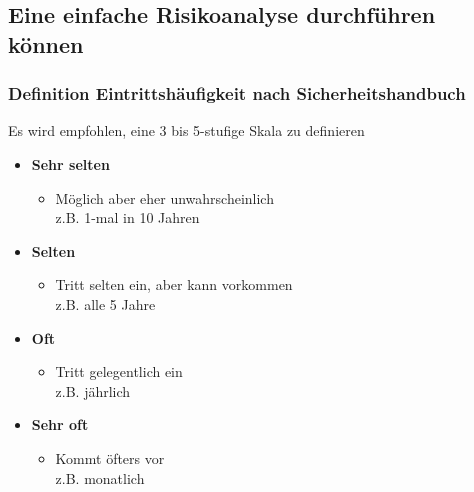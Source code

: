\documentclass[10pt,a4paper]{article}
\begin{document}
\subsection*{Eine einfache Risikoanalyse durchführen können}
\subsubsection*{Definition Eintrittshäufigkeit nach Sicherheitshandbuch}
Es wird empfohlen, eine 3 bis 5-stufige Skala zu definieren
\begin{itemize}[noitemsep,topsep=0pt,leftmargin=*]
    \item \textbf{Sehr selten}
    \begin{itemize}[noitemsep,topsep=0pt,leftmargin=*]
        \item Möglich aber eher unwahrscheinlich \\z.B. 1-mal in 10 Jahren
    \end{itemize}
    \item \textbf{Selten}
    \begin{itemize}[noitemsep,topsep=0pt,leftmargin=*]
        \item Tritt selten ein, aber kann vorkommen\\z.B. alle 5 Jahre
    \end{itemize}
    \item \textbf{Oft}
    \begin{itemize}[noitemsep,topsep=0pt,leftmargin=*]
        \item Tritt gelegentlich ein\\z.B. jährlich
    \end{itemize}
    \item \textbf{Sehr oft}
    \begin{itemize}[noitemsep,topsep=0pt,leftmargin=*]
        \item Kommt öfters vor\\z.B. monatlich
    \end{itemize}
\end{itemize}
\end{document}
